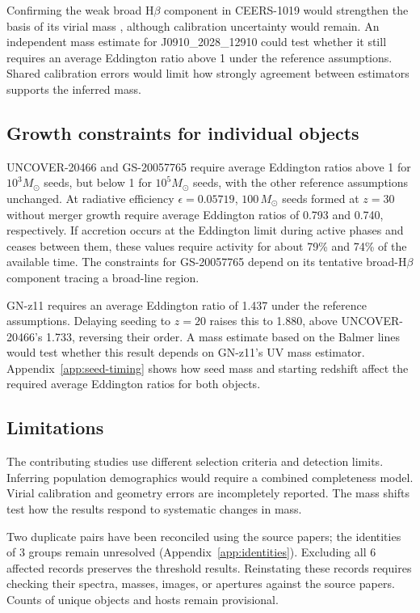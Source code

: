 \documentclass[11pt]{article}
\begin{document}
Confirming the weak
broad H$\beta$ component in CEERS-1019 would strengthen the basis of its virial
mass \citep{larson2023}, although calibration uncertainty would remain.
An independent mass estimate for J0910\_2028\_12910 could test whether it
still requires an average Eddington ratio above 1 under the reference assumptions. Shared calibration errors would limit how strongly
agreement between estimators supports the inferred mass.

\FloatBarrier
\subsection{Growth constraints for individual objects}

UNCOVER-20466 and GS-20057765 require average Eddington ratios above 1
for $10^3M_\odot$ seeds, but below 1 for $10^5M_\odot$ seeds, with the other
reference assumptions unchanged. At radiative efficiency $\epsilon=0.05719$,
$100\,M_\odot$ seeds formed at $z=30$ without merger growth require average
Eddington ratios of 0.793 and 0.740, respectively. If accretion occurs at the
Eddington limit during active phases and ceases between them, these values
require activity for about 79\% and 74\% of the available time.
The constraints for GS-20057765 depend on its tentative broad-H$\beta$
component tracing a broad-line region.

GN-z11 requires an average Eddington ratio of 1.437 under the reference
assumptions. Delaying seeding to $z=20$ raises this to 1.880, above
UNCOVER-20466's 1.733, reversing their order. A mass estimate based on the
Balmer lines would test whether this result depends on GN-z11's UV mass
estimator. Appendix~\ref{app:seed-timing} shows how seed mass and starting
redshift affect the required average Eddington ratios for both objects.

\subsection{Limitations}
\label{sec:limits}

The contributing studies use different selection criteria and detection
limits. Inferring population demographics would require a combined completeness
model. Virial calibration and geometry errors are incompletely reported.
The mass shifts test how the results respond to systematic changes in mass.

Two duplicate pairs have been reconciled using the source papers; the identities
of 3 groups remain unresolved
(Appendix~\ref{app:identities}). Excluding all 6 affected records preserves
the threshold results. Reinstating these records requires checking their spectra, masses, images, or
apertures against the source papers. Counts of unique objects and hosts remain
provisional.
\end{document}
